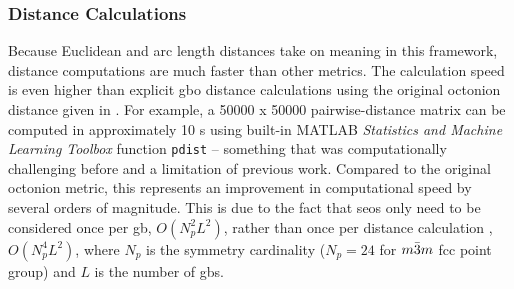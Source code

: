 \documentclass[preprint,12pt]{elsarticle}
\begin{document}
\subsubsection{Distance Calculations}
Because Euclidean and arc length distances take on meaning in this framework, distance computations are much faster than other metrics. The calculation speed is even higher than explicit \gls{gbo} distance calculations using the original octonion distance given in \cite{francisGeodesicOctonionMetric2019}. For example, a \num{50000} x \num{50000} pairwise-distance matrix can be computed in approximately 10 s using built-in MATLAB \textit{Statistics and Machine Learning Toolbox} function \texttt{pdist} -- something that was computationally challenging before and a limitation of previous work. Compared to the original octonion metric, this represents an improvement in computational speed by several orders of magnitude. This is due to the fact that \glspl{seo} only need to be considered once per \gls{gb}, $O(N_p^2L^2)$, rather than once per distance calculation 
, $O(N_p^4L^2)$, where $N_p$ is the symmetry cardinality ($N_p=24$ for $m\Bar{3}m$ \gls{fcc} point group) and $L$ is the number of \glspl{gb}. %
\end{document}
